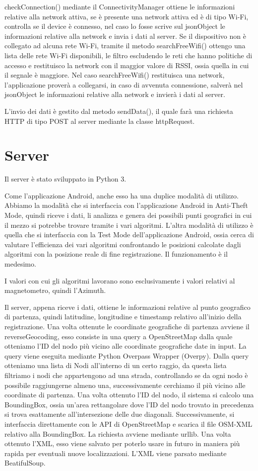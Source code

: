 \documentclass[12pt,a4paper,openright,twoside]{report}
\begin{document}
checkConnection() mediante il ConnectivityManager ottiene le informazioni relative alla network attiva, se è presente una network attiva ed è di tipo Wi-Fi, controlla se il device è connesso, nel caso lo fosse scrive sul jsonObject le informazioni relative alla network e invia i dati al server.
Se il dispositivo non è collegato ad alcuna rete Wi-Fi, tramite il metodo searchFreeWifi() ottengo una lista delle rete Wi-Fi disponibili, le filtro escludendo le reti che hanno politiche di accesso e restituisco la network con il maggior valore di RSSI, ossia quella in cui il segnale è maggiore. 
Nel caso searchFreeWifi() restituisca una network, l'applicazione proverà a collegarsi, in caso di avvenuta connessione, salverà nel jsonObject le informazioni relative alla network e invierà i dati al server.

L'invio dei dati è gestito dal metodo sendData(), il quale farà una richiesta HTTP di tipo POST al server mediante la classe httpRequest.

\newpage
\section{Server}
Il server è stato sviluppato in Python 3.

Come l'applicazione Android, anche esso ha una duplice modalità di utilizzo. Abbiamo la modalità che si interfaccia con l'applicazione Android in Anti-Theft Mode, quindi riceve i dati, li analizza e genera dei possibili punti geografici in cui il mezzo si potrebbe trovare tramite i vari algoritmi. L'altra modalità di utilizzo è quella che si interfaccia con la Test Mode dell'applicazione Android, ossia cerca di valutare l'efficienza dei vari algoritmi confrontando le posizioni calcolate dagli algoritmi con la posizione reale di fine registrazione. 
Il funzionamento è il medesimo.

I valori con cui gli algoritmi lavorano sono esclusivamente i valori relativi al magnetometro, quindi l'Azimuth.

Il server, appena riceve i dati, ottiene le informazioni relative al punto geografico di partenza, quindi latitudine, longitudine e timestamp relativo all'inizio della registrazione.
Una volta ottenute le coordinate geografiche di partenza avviene il reverseGeocoding, esso consiste in una query a OpenStreetMap dalla quale otteniamo l'ID del nodo più vicino alle coordinate geografiche date in input. La query viene eseguita mediante Python Overpass Wrapper (Overpy). Dalla query otteniamo una lista di Nodi all'interno di un certo raggio, da questa lista filtriamo i nodi che appartengono ad una strada, controllando se da ogni nodo è possibile raggiungerne almeno una, successivamente cerchiamo il più vicino alle coordinate di partenza.
Una volta ottenuto l'ID del nodo, il sistema si calcolo una BoundingBox, ossia un'area rettangolare dove l'ID del nodo trovato in precedenza si trova esattamente all'intersezione delle due diagonali. Successivamente, si interfaccia direttamente con le API di OpenStreetMap e scarica il file OSM-XML relativo alla BoundingBox. La richiesta avviene mediante urllib. Una volta ottenuto l'XML, esso viene salvato per poterlo usare in futuro in maniera più rapida per eventuali nuove localizzazioni. L'XML viene parsato mediante BeatifulSoup.
\end{document}
